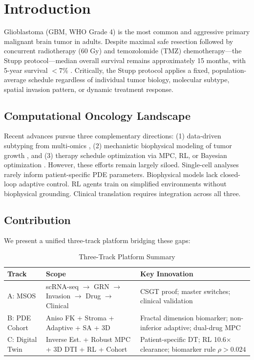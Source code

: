 \documentclass[11pt, twocolumn]{article}
\begin{document}
\section{Introduction}

Glioblastoma (GBM, WHO Grade 4) is the most common and aggressive primary malignant brain tumor in adults. Despite maximal safe resection followed by concurrent radiotherapy (60 Gy) and temozolomide (TMZ) chemotherapy—the Stupp protocol—median overall survival remains approximately 15 months, with 5-year survival $<$7\% \citep{stupp2005}. Critically, the Stupp protocol applies a fixed, population-average schedule regardless of individual tumor biology, molecular subtype, spatial invasion pattern, or dynamic treatment response.

\subsection{Computational Oncology Landscape}
Recent advances pursue three complementary directions: (1) data-driven subtyping from multi-omics \citep{jackson2024}, (2) mechanistic biophysical modeling of tumor growth \citep{swanson2003, hormuth2017}, and (3) therapy schedule optimization via MPC, RL, or Bayesian optimization \citep{neal2020, zhang2023}. However, these efforts remain largely siloed. Single-cell analyses rarely inform patient-specific PDE parameters. Biophysical models lack closed-loop adaptive control. RL agents train on simplified environments without biophysical grounding. Clinical translation requires integration across all three.

\subsection{Contribution}
We present a unified three-track platform bridging these gaps:

\begin{table}[h]
\centering
\caption{Three-Track Platform Summary}
\begin{tabular}{lll}
\toprule
Track & Scope & Key Innovation \\
\midrule
A: MSOS & scRNA-seq $\to$ GRN $\to$ Invasion $\to$ Drug $\to$ Clinical & CSGT proof; master switches; clinical validation \\
B: PDE Cohort & Aniso FK + Stroma + Adaptive + SA + 3D & Fractal dimension biomarker; non-inferior adaptive; dual-drug MPC \\
C: Digital Twin & Inverse Est. + Robust MPC + 3D DTI + RL + Cohort & Patient-specific DT; RL 10.6$\times$ clearance; biomarker rule $\rho>0.024$ \\
\bottomrule
\end{tabular}
\end{table}
\end{document}
